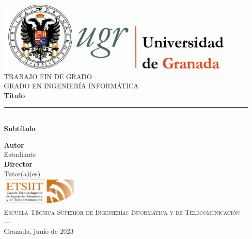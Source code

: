 \begin{titlepage}
\newlength{\centeroffset}
\setlength{\centeroffset}{-0.5\oddsidemargin}
\addtolength{\centeroffset}{0.5\evensidemargin}
\thispagestyle{empty}

\noindent\hspace*{\centeroffset}\begin{minipage}{\textwidth}

\centering
\includegraphics[width=0.9\textwidth]{logos/logo_ugr.jpg}\\[1.4cm]

\textsc{ \Large TRABAJO FIN DE GRADO\\[0.2 cm]}
\textsc{ GRADO EN INGENIERÍA INFORMÁTICA}\\[1 cm]

{\Huge\bfseries Título \\}
\noindent\rule[-1ex]{\textwidth}{3pt}\\[3.5 ex]
{\large\bfseries Subtítulo }
\end{minipage}

\vspace{2.5cm}
\noindent\hspace*{\centeroffset}
\begin{minipage}{\textwidth}
\centering

\textbf{Autor}\\ {Estudiante}\\[2.5 ex]
\textbf{Director}\\ {Tutor(a)(es)}\\[2 cm]
\includegraphics[width=0.3\textwidth]{logos/etsiit_logo.png}\\[0.1 cm]
\textsc{Escuela Técnica Superior de Ingenierías Informática y de Telecomunicación}\\
\textsc{---}\\
Granada, junio de 2023
\end{minipage}
\end{titlepage}
